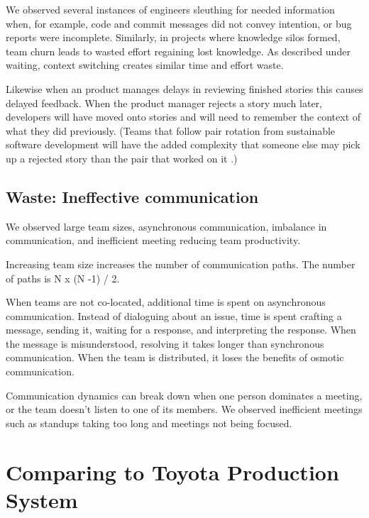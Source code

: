 We observed several instances of engineers sleuthing for needed information when, for example, code and commit messages did not convey intention, or bug reports were incomplete. Similarly, in projects where knowledge silos formed, team churn leads to wasted effort regaining lost knowledge. As described under waiting, context switching creates similar time and effort waste. 

Likewise when an product manages delays in reviewing finished stories this causes delayed feedback. When the product manager rejects a story much later, developers will have moved onto stories and will need to remember the context of what they did previously. (Teams that follow pair rotation from sustainable software development will have the added complexity that someone else may pick up a rejected story than the pair that worked on it  \cite{SedanoSustainableSoftware}.)

\subsection{Waste: Ineffective communication}
We observed large team sizes, asynchronous communication, imbalance in communication, and inefficient meeting reducing team productivity.

Increasing team size increases the number of communication paths. The number of paths is N x (N -1) / 2. 

When teams are not co-located, additional time is spent on asynchronous communication. Instead of dialoguing about an issue, time is spent crafting a message, sending it, waiting for a response, and interpreting the response. When the message is misunderstood, resolving it takes longer than synchronous communication. When the team is distributed, it loses the benefits of osmotic communication.

Communication dynamics can break down when one person dominates a meeting, or the team doesn't listen to one of its members. We observed inefficient meetings such as standups taking too long and meetings not being focused. 

\section{Comparing to Toyota Production System}

